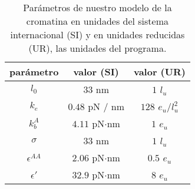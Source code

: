 \begin{table}
    \centering
    \begin{tabular}{c c c}
        \toprule
        parámetro       & valor (SI)         & valor (UR)          \\
        \midrule
        $l_0$           & $33$ nm            & $1$ $l_u$           \\
        $k_e$           & $0.48$ pN / nm     & $128$ $e_u$/$l_u^2$ \\
        $k_b^A$         & $4.11$ pN$\cdot$nm & $1$ $e_u$           \\
        $\sigma$        & $33$ nm            & $1$ $l_u$           \\
        $\epsilon^{AA}$ & $2.06$ pN$\cdot$nm & $0.5$ $e_u$         \\
        $\epsilon'$     & $32.9$ pN$\cdot$nm & $8$ $e_u$           \\
        \bottomrule
    \end{tabular}
    \caption{Parámetros de nuestro modelo de la cromatina en unidades del sistema internacional (SI) y en unidades reducidas (UR), las unidades del programa.}
    \label{tab:parameters}
\end{table}
